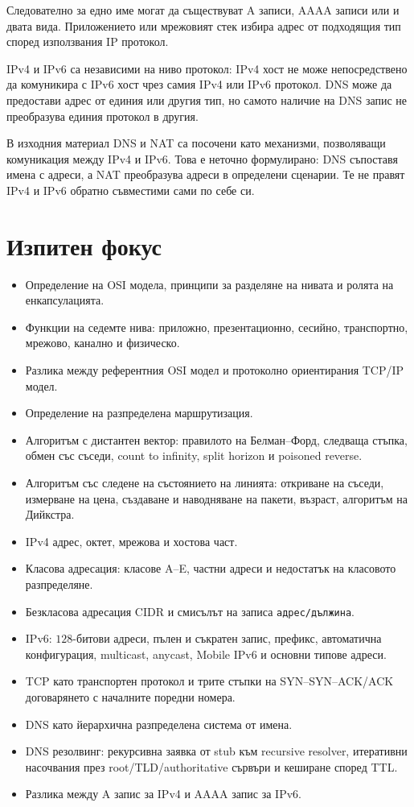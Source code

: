 Следователно за едно име могат да съществуват A записи, AAAA записи или и двата вида. Приложението или мрежовият стек избира адрес от подходящия тип според използвания IP протокол.

IPv4 и IPv6 са независими на ниво протокол: IPv4 хост не може непосредствено да комуникира с IPv6 хост чрез самия IPv4 или IPv6 протокол. DNS може да предостави адрес от единия или другия тип, но самото наличие на DNS запис не преобразува единия протокол в другия.

\begin{supp}[Бележка]
В изходния материал DNS и NAT са посочени като механизми, позволяващи комуникация между IPv4 и IPv6. Това е неточно формулирано: DNS съпоставя имена с адреси, а NAT преобразува адреси в определени сценарии. Те не правят IPv4 и IPv6 обратно съвместими сами по себе си.
\end{supp}

\section{Изпитен фокус}\label{s:13.8}

\begin{itemize}
    \item Определение на OSI модела, принципи за разделяне на нивата и ролята на енкапсулацията.
    \item Функции на седемте нива: приложно, презентационно, сесийно, транспортно, мрежово, канално и физическо.
    \item Разлика между референтния OSI модел и протоколно ориентирания TCP/IP модел.
    \item Определение на разпределена маршрутизация.
    \item Алгоритъм с дистантен вектор: правилото на Белман--Форд, следваща стъпка, обмен със съседи, count to infinity, split horizon и poisoned reverse.
    \item Алгоритъм със следене на състоянието на линията: откриване на съседи, измерване на цена, създаване и наводняване на пакети, възраст, алгоритъм на Дийкстра.
    \item IPv4 адрес, октет, мрежова и хостова част.
    \item Класова адресация: класове A--E, частни адреси и недостатък на класовото разпределяне.
    \item Безкласова адресация CIDR и смисълът на записа \verb|адрес/дължина|.
    \item IPv6: $128$-битови адреси, пълен и съкратен запис, префикс, автоматична конфигурация, multicast, anycast, Mobile IPv6 и основни типове адреси.
    \item TCP като транспортен протокол и трите стъпки на SYN--SYN--ACK/ACK договарянето с началните поредни номера.
    \item DNS като йерархична разпределена система от имена.
    \item DNS резолвинг: рекурсивна заявка от stub към recursive resolver, итеративни насочвания през root/TLD/authoritative сървъри и кеширане според TTL.
    \item Разлика между A запис за IPv4 и AAAA запис за IPv6.
\end{itemize}
